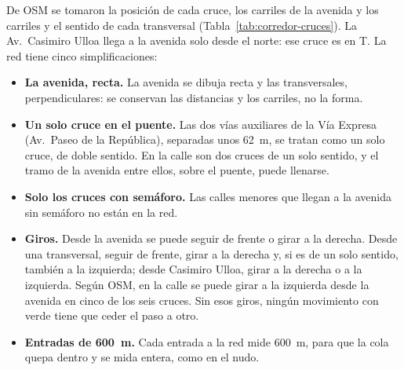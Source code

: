 De OSM se tomaron la posición de cada cruce, los carriles de la avenida
y los carriles y el sentido de cada transversal
(Tabla~\ref{tab:corredor-cruces}). La Av.~Casimiro Ulloa
llega a la avenida solo desde el norte: ese cruce es en T. La red tiene
cinco simplificaciones:
\begin{itemize}
  \item \textbf{La avenida, recta.} La avenida se dibuja recta y las
    transversales, perpendiculares: se conservan las distancias y los
    carriles, no la forma.
  \item \textbf{Un solo cruce en el puente.} Las dos vías auxiliares de
    la Vía Expresa (Av.~Paseo de la República), separadas unos 62~m, se
    tratan como un solo cruce, de doble sentido. En la calle son dos
    cruces de un solo sentido, y el tramo de la avenida entre ellos,
    sobre el puente, puede llenarse.
  \item \textbf{Solo los cruces con semáforo.} Las calles menores que
    llegan a la avenida sin semáforo no están en la red.
  \item \textbf{Giros.} Desde la avenida se puede seguir de frente o
    girar a la derecha. Desde una transversal, seguir de frente, girar a
    la derecha y, si es de un solo sentido, también a la izquierda; desde
    Casimiro Ulloa, girar a la derecha o a la izquierda. Según
    OSM, en la calle se puede girar a la izquierda desde la avenida en
    cinco de los seis cruces. Sin esos giros, ningún movimiento con verde
    tiene que ceder el paso a otro.
  \item \textbf{Entradas de 600~m.} Cada entrada a la red mide 600~m,
    para que la cola quepa dentro y se mida entera, como en el nudo.
\end{itemize}


